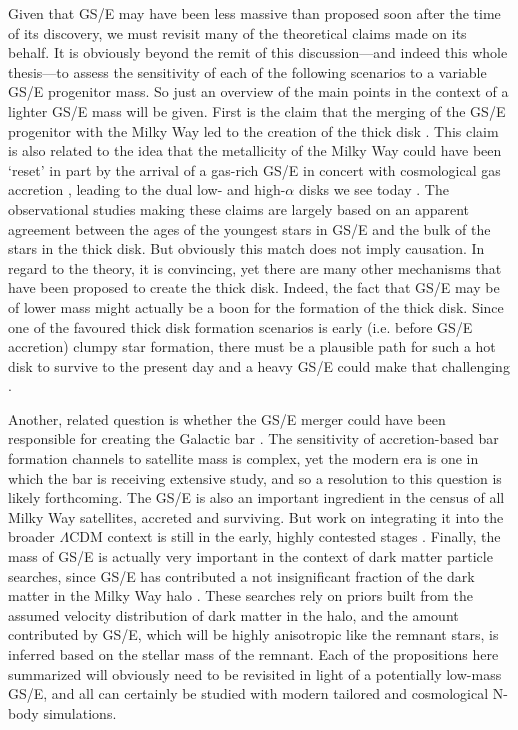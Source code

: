 Given that GS/E may have been less massive than proposed soon after the time of its discovery, we must revisit many of the theoretical claims made on its behalf. It is obviously beyond the remit of this discussion---and indeed this whole thesis---to assess the sensitivity of each of the following scenarios to a variable GS/E progenitor mass. So just an overview of the main points in the context of a lighter GS/E mass will be given. First is the claim that the merging of the GS/E progenitor with the Milky Way led to the creation of the thick disk \parencite[e.g.][]{helmi18,gallart19}. This claim is also related to the idea that the metallicity of the Milky Way could have been `reset' in part by the arrival of a gas-rich GS/E in concert with cosmological gas accretion \parencite[e.g.][]{grand20,renaud21,ciuca24}, leading to the dual low- and high-$\alpha$ disks we see today \parencite[see also the two-infall model of e.g.][]{chiappini97}. The observational studies making these claims are largely based on an apparent agreement between the ages of the youngest stars in GS/E and the bulk of the stars in the thick disk. But obviously this match does not imply causation. In regard to the theory, it is convincing, yet there are many other mechanisms that have been proposed to create the thick disk. Indeed, the fact that GS/E may be of lower mass might actually be a boon for the formation of the thick disk. Since one of the favoured thick disk formation scenarios is early (i.e. before GS/E accretion) clumpy star formation, there must be a plausible path for such a hot disk to survive to the present day and a heavy GS/E could make that challenging \parencite[see e.g. arguments for this in][]{deason24}. 

Another, related question is whether the GS/E merger could have been responsible for creating the Galactic bar \parencite{fragkoudi20,merrow23}. The sensitivity of accretion-based bar formation channels to satellite mass is complex, yet the modern era is one in which the bar is receiving extensive study, and so a resolution to this question is likely forthcoming. The GS/E is also an important ingredient in the census of all Milky Way satellites, accreted and surviving. But work on integrating it into the broader $\Lambda$CDM context is still in the early, highly contested stages \parencite{fattahi20,naidu22}. Finally, the mass of GS/E is actually very important in the context of dark matter particle searches, since GS/E has contributed a not insignificant fraction of the dark matter in the Milky Way halo \parencite{necib19,evans19}. These searches rely on priors built from the assumed velocity distribution of dark matter in the halo, and the amount contributed by GS/E, which will be highly anisotropic like the remnant stars, is inferred based on the stellar mass of the remnant. Each of the propositions here summarized will obviously need to be revisited in light of a potentially low-mass GS/E, and all can certainly be studied with modern tailored and cosmological N-body simulations. 

